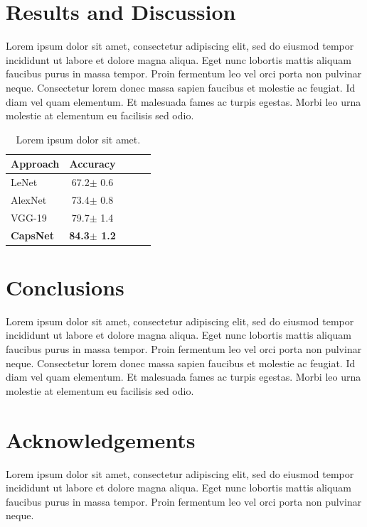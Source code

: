 \documentclass{article}
\begin{document}
\section{Results and Discussion}

Lorem ipsum dolor sit amet, consectetur adipiscing elit, sed do eiusmod tempor incididunt ut labore et dolore magna aliqua. Eget nunc lobortis mattis aliquam faucibus purus in massa tempor. Proin fermentum leo vel orci porta non pulvinar neque. Consectetur lorem donec massa sapien faucibus et molestie ac feugiat. Id diam vel quam elementum. Et malesuada fames ac turpis egestas. Morbi leo urna molestie at elementum eu facilisis sed odio.


\begin{table}[H]
\caption{Lorem ipsum dolor sit amet.}
\label{cnns-table}
\vskip 0.15in
\begin{center}
\begin{small}
\begin{sc}
\begin{tabular}{lcccr}
\toprule
\textbf{Approach} & \textbf{Accuracy} \\
\midrule
LeNet & 67.2$\pm$ 0.6 \\
AlexNet & 73.4$\pm$ 0.8 \\
VGG-19 & 79.7$\pm$ 1.4 \\
\textbf{CapsNet} & \textbf{84.3$\pm$ 1.2} \\
\bottomrule
\end{tabular}
\end{sc}
\end{small}
\end{center}
\vskip -0.1in
\end{table}



\section{Conclusions}

Lorem ipsum dolor sit amet, consectetur adipiscing elit, sed do eiusmod tempor incididunt ut labore et dolore magna aliqua. Eget nunc lobortis mattis aliquam faucibus purus in massa tempor. Proin fermentum leo vel orci porta non pulvinar neque. Consectetur lorem donec massa sapien faucibus et molestie ac feugiat. Id diam vel quam elementum. Et malesuada fames ac turpis egestas. Morbi leo urna molestie at elementum eu facilisis sed odio.




\section*{Acknowledgements}

Lorem ipsum dolor sit amet, consectetur adipiscing elit, sed do eiusmod tempor incididunt ut labore et dolore magna aliqua. Eget nunc lobortis mattis aliquam faucibus purus in massa tempor. Proin fermentum leo vel orci porta non pulvinar neque.









\end{document}
